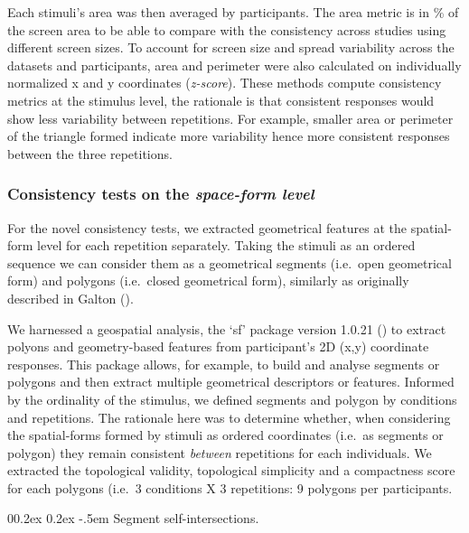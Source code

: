 \documentclass[
  man,
  longtable,
  a4paper,
  nolmodern,
  notxfonts,
  notimes,
  colorlinks=true,linkcolor=blue,citecolor=blue,urlcolor=blue]{apa7}
\makeatletter
\renewcommand{\paragraph}{\@startsection{paragraph}{4}{\parindent}%
	{0\baselineskip \@plus 0.2ex \@minus 0.2ex}%
	{-.5em}%
	{\normalfont\normalsize\bfseries\typesectitle}}
\makeatother
\begin{document}
Each stimuli's area was then averaged by participants. The area metric
is in \% of the screen area to be able to compare with the consistency
across studies using different screen sizes. To account for screen size
and spread variability across the datasets and participants, area and
perimeter were also calculated on individually normalized x and y
coordinates (\emph{z-score}). These methods compute consistency metrics
at the stimulus level, the rationale is that consistent responses would
show less variability between repetitions. For example, smaller area or
perimeter of the triangle formed indicate more variability hence more
consistent responses between the three repetitions.

\subsubsection{\texorpdfstring{Consistency tests on the \emph{space-form
level}}{Consistency tests on the space-form level}}\label{consistency-tests-on-the-space-form-level}

For the novel consistency tests, we extracted geometrical features at
the spatial-form level for each repetition separately. Taking the
stimuli as an ordered sequence we can consider them as a geometrical
segments (i.e.~open geometrical form) and polygons (i.e.~closed
geometrical form), similarly as originally described in Galton
().

We harnessed a geospatial analysis, the `sf' package version 1.0.21
() to extract polyons and
geometry-based features from participant's 2D (x,y) coordinate
responses. This package allows, for example, to build and analyse
segments or polygons and then extract multiple geometrical descriptors
or features. Informed by the ordinality of the stimulus, we defined
segments and polygon by conditions and repetitions. The rationale here
was to determine whether, when considering the spatial-forms formed by
stimuli as ordered coordinates (i.e.~as segments or polygon) they remain
consistent \emph{between} repetitions for each individuals. We extracted
the topological validity, topological simplicity and a compactness score
for each polygons (i.e.~3 conditions X 3 repetitions: 9 polygons per
participants.

\paragraph{Segment
self-intersections.}\label{segment-self-intersections}
\end{document}

